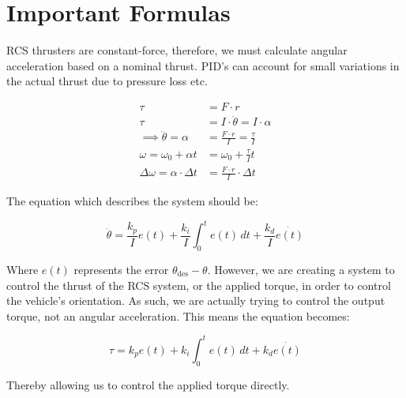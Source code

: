 \documentclass[11pt]{scrartcl}
\begin{document}
\section{Important Formulas}
RCS thrusters are constant-force, therefore, we must calculate angular acceleration based on a nominal thrust. PID's can account for small variations in the actual thrust due to pressure loss etc.

\begin{align}
	\tau &= F \cdot r \\
	\tau &= I \cdot \ddot{\theta} = I \cdot \alpha \\
	\implies \ddot{\theta} = \alpha &= \frac{F \cdot r}{I} = \frac{\tau}{I}\\
	\omega = \omega_0 + \alpha t &= \omega_0 + \frac{\tau}{I} t \\
	\Delta \omega = \alpha \cdot \Delta t &= \frac{F \cdot r}{I} \cdot \Delta t 
\end{align}
	
The equation which describes the system should be:

\begin{equation}
	\ddot{\theta} = \frac{k_p}{I} e(t) + \frac{k_i}{I} \int_{0}^{t} e(t) \, dt + \frac{k_d}{I}\dot{e(t)}%
\end{equation}

Where \(e(t)\) represents the error \(\theta_\text{des} - \theta\). However, we are creating a system to control the thrust of the RCS system, or the applied torque, in order to control the vehicle's orientation. As such, we are actually trying to control the output torque, not an angular acceleration. This means the equation becomes:

\begin{equation}
	\tau = k_p e(t) + k_i \int_{0}^{t} e(t) \, dt + k_d \dot{e(t)}%
\end{equation}

Thereby allowing us to control the applied torque directly.

%
%
\end{document}
